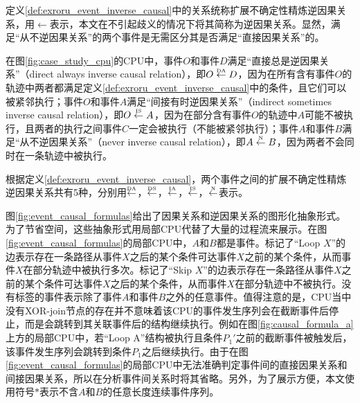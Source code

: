 定义\ref{def:exroru_event_inverse_causal}中的关系统称扩展不确定性精炼逆因果关系，用$\leftarrow$表示，本文在不引起歧义的情况下将其简称为逆因果关系。显然，满足“从不逆因果关系”的两个事件是无需区分其是否满足“直接因果关系”的。

\begin{example}\label{ex:exroru_event_inverse_causal}
在图\ref{fig:case_study_cpu}的CPU中，事件$O$和事件$D$满足“直接总是逆因果关系”（direct always inverse causal relation），即$O\overset{\text{\tiny{DA}}}{\leftarrow}D$，因为在所有含有事件$O$的轨迹中两者都满足定义\ref{def:exroru_event_inverse_causal}中的条件，且它们可以被紧邻执行；事件$O$和事件$A$满足“间接有时逆因果关系”（indirect sometimes inverse causal relation），即$O\overset{\text{\tiny{IS}}}{\leftarrow}A$，因为在部分含有事件$O$的轨迹中$A$可能不被执行，且两者的执行之间事件$C$一定会被执行（不能被紧邻执行）；事件$A$和事件$B$满足“从不逆因果关系”（never inverse causal relation），即$A\overset{\text{\tiny{N}}}{\leftarrow}B$，因为两者不会同时在一条轨迹中被执行。
\end{example}

根据定义\ref{def:exroru_event_inverse_causal}，两个事件之间的扩展不确定性精炼逆因果关系共有5种，分别用$\overset{\text{\tiny{DA}}}{\leftarrow}$，$\overset{\text{\tiny{DS}}}{\leftarrow}$，$\overset{\text{\tiny{IA}}}{\leftarrow}$，$\overset{\text{\tiny{IS}}}{\leftarrow}$，$\overset{\text{\tiny{N}}}{\leftarrow}$表示。

图\ref{fig:event_causal_formulas}给出了因果关系和逆因果关系的图形化抽象形式。为了节省空间，这些抽象形式用局部CPU代替了大量的过程流来展示。在图\ref{fig:event_causal_formulas}的局部CPU中，$A$和$B$都是事件。标记了“Loop $X$”的边表示存在一条路径从事件$X$之后的某个条件可达事件$X$之前的某个条件，从而事件$X$在部分轨迹中被执行多次。标记了“Skip $X$”的边表示存在一条路径从事件$X$之前的某个条件可达事件$X$之后的某个条件，从而事件$X$在部分轨迹中不被执行。没有标签的事件表示除了事件$A$和事件$B$之外的任意事件。值得注意的是，CPU当中没有XOR-join节点的存在并不意味着该CPU的事件发生序列会在截断事件后停止，而是会跳转到其关联事件后的结构继续执行。例如在图\ref{fig:causal_formula_a}上方的局部CPU中，若“Loop A”结构被执行且条件$P_{1}'$之前的截断事件被触发后，该事件发生序列会跳转到条件$P_{1}$之后继续执行。由于在图\ref{fig:event_causal_formulas}的局部CPU中无法准确判定事件间的直接因果关系和间接因果关系，所以在分析事件间关系时将其省略。另外，为了展示方便，本文使用符号$*$表示不含$A$和$B$的任意长度连续事件序列。

